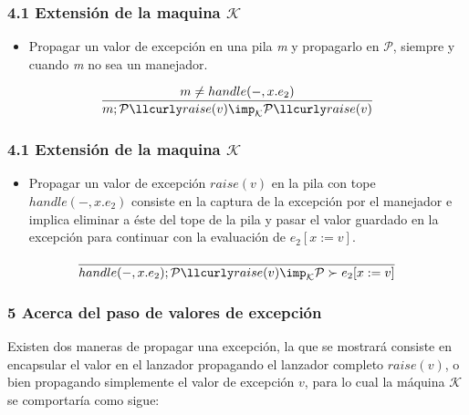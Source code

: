 \documentclass[xcolor=dvipsnames,table,spanish]{beamer}
\begin{document}
\begin{frame}
\frametitle{4.1 Extensión de la maquina $\mathcal{K}$}
\begin{itemize}
\item Propagar un valor de excepción en una pila \textit{m} y propagarlo en $\mathcal{P}$, siempre y cuando \textit{m} no sea un manejador.
\end{itemize}

\[\frac{m \neq handle(-,x.e_2)}{m; \mathcal{P} \llcurly raise(v) \imp_{\mathcal{K}} \mathcal{P} \llcurly raise(v)}\]

\end{frame}
\begin{frame}
\frametitle{4.1 Extensión de la maquina $\mathcal{K}$}
\begin{itemize}
\item Propagar un valor de excepción $raise(v)$ en la pila con tope $handle(-,x.e_2)$ consiste en la captura de la excepción por el manejador e implica eliminar a éste del tope de la pila y pasar el valor guardado en la excepción para continuar con la evaluación de $e_2[x:=v]$.
\end{itemize}

\[\frac{}{handle(-,x.e_2);\mathcal{P} \llcurly raise(v) \imp_{\mathcal{K}} \mathcal{P} \succ e_2[x:=v]}\]

\end{frame}
\begin{frame}
\frametitle{5 Acerca del paso de valores de excepción}
Existen dos maneras de propagar una excepción, la que se mostrará consiste en encapsular el valor en el lanzador propagando el lanzador completo $raise(v)$, o bien propagando simplemente el valor de excepción $v$, para lo cual la máquina $\mathcal{K}$ se comportaría como sigue:
\end{frame}
\end{document}
